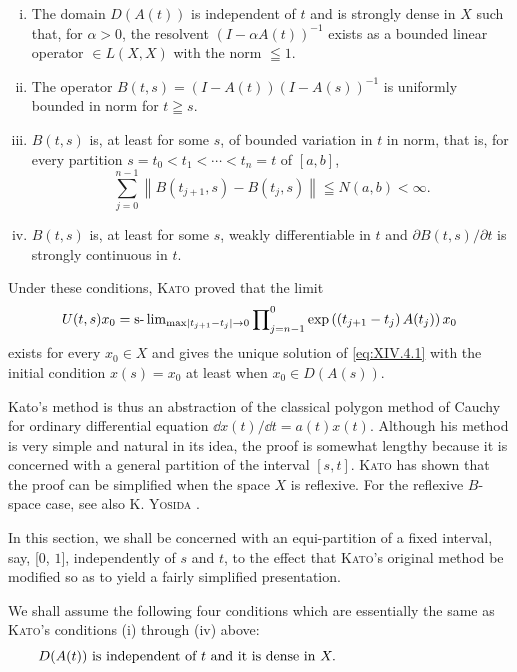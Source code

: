 \begin{enumerate}[(i)]
\item The domain $D(A(t))$ is independent of $t$ and is strongly dense in $X$ such that, for $\alpha > 0$, the resolvent $(I - \alpha A(t))^{-1}$ exists as a bounded linear operator $\in L(X, X)$ with the norm $\leqq 1$.
\item The operator $B(t, s) = (I - A(t))(I - A(s))^{-1}$ is uniformly bounded in norm for $t \geqq s$.
\item $B(t, s)$ is, at least for some $s$, of bounded variation in $t$ in norm, that is, for every partition $s = t_{0} < t_{1} < \cdots < t_{n} = t$ of $[a, b]$, 
\[
\sum\limits_{j=0} ^{n-1} \left\| B (t _{j+1}, s) - B (t _{j}, s) \right\| \leqq N (a, b) < \infty .
\]
\item $B(t, s)$ is, at least for some $s$, weakly differentiable in $t$ and $\partial B(t, s)/\partial t$ is strongly continuous in $t$.
\end{enumerate}
Under these conditions, \textsc{Kato} proved that the limit 
\[
U (t, s) x _{0} = \underset {\max \left| t _{j+1} - t _{j} \right|\rightarrow 0} {\slim} \prod\limits_{j=n-1} ^{0} \exp \left(\left(t _{j+1} - t _{j}\right) A (t _{j})\right) x _{0}
\]
exists for every $x_0 \in X$ and gives the unique solution of \eqref{eq:XIV.4.1} with the initial condition $x(s) = x_0$ at least when $x_0 \in D(A(s))$. 

Kato's method is thus an abstraction of the classical polygon method of Cauchy for ordinary differential equation $\dd x(t) / \dd t = a(t)x(t)$. Although his method is very simple and natural in its idea, the proof is somewhat lengthy because it is concerned with a general partition of the interval $[s,t]$. \textsc{Kato} \cite{kato136} has shown that the proof can be simplified when the space $X$ is reflexive. For the reflexive $B$-space case, see also K. \textsc{Yosida} \cite{yosida371}. 

In this section, we shall be concerned with an equi-partition of a fixed interval, say, [$0$, $1$], independently of $s$ and $t$, to the effect that \textsc{Kato}'s original method be modified so as to yield a fairly simplified presentation. 

We shall assume the following four conditions which are essentially the same as \textsc{Kato}'s conditions (i) through (iv) above: 
\begin{equation}
\label{eq:XIV.4.2}
\begin{minipage}{0.92\linewidth}
\everymath{}\let\limits\nolimits
$D (A (t))$ is independent of $t$ and it is dense in $X.$
\end{minipage}
\end{equation}

